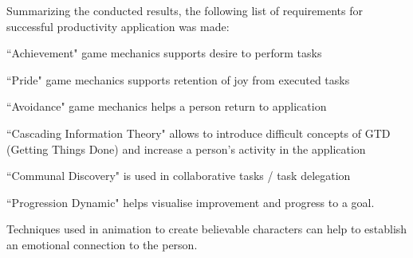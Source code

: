 Summarizing the conducted results, the following list of requirements for successful productivity application was made:
\begin{compactitem}
\item ``Achievement" game mechanics supports desire to perform tasks
\item ``Pride" game mechanics supports retention of joy from executed tasks
\item ``Avoidance" game mechanics helps a person return to application
\item ``Cascading Information Theory" allows to introduce difficult concepts of GTD (Getting Things Done) and increase a person’s activity in the application
\item ``Communal Discovery" is used in collaborative tasks / task delegation
\item ``Progression Dynamic" helps visualise improvement and progress to a goal.
\end{compactitem}

Techniques used in animation to create believable characters can help to establish an emotional connection to the person.
